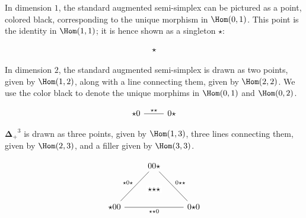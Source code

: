 \documentclass[10pt]{art.cls/art}
\newcommand{\DeltaPlus}{\ensuremath{\boldsymbol{\Delta}_+}}
\newcommand{\kstar}{{\star}}
\begin{document}
\begin{example}[$\DeltaPlus^1$]
  In dimension $1$, the standard augmented semi-simplex can be pictured as a point, colored black, corresponding to the unique morphism in $\Hom(0, 1)$. This point is the identity in $\Hom(1, 1)$; it is hence shown as a singleton $\kstar$:

  \begin{equation*}
    \begin{tikzcd}
      \kstar
    \end{tikzcd}
  \end{equation*}
\end{example}

\begin{example}[$\DeltaPlus^2$]
  In dimension $2$, the standard augmented semi-simplex is drawn as two points, given by $\Hom(1, 2)$, along with a line connecting them, given by $\Hom(2, 2)$. We use the color black to denote the unique morphims in $\Hom(0, 1)$ and $\Hom(0, 2)$.

  \begin{equation*}
    \begin{tikzcd}
      \kstar0 \arrow[r, dash, "\kstar\kstar"] & 0\kstar
    \end{tikzcd}
  \end{equation*}
\end{example}

\begin{example}[$\DeltaPlus^3$]
  $\DeltaPlus^3$ is drawn as three points, given by $\Hom(1, 3)$, three lines connecting them, given by $\Hom(2, 3)$, and a filler given by $\Hom(3, 3)$.

  \begin{equation*}
    \begin{tikzcd}
      & |[alias=F]|00\kstar \arrow[ddr, dash, "0\kstar\kstar"] & \\\\
      \kstar00 \arrow[rr, dash, "\kstar\kstar0"{name=T, below}]\arrow[uur, dash, "\kstar0\kstar"] && 0\kstar0 \\
      \arrow[rightarrow, from=F, to=T, phantom, "\kstar\kstar\kstar" description]
    \end{tikzcd}
  \end{equation*}
\end{example}
\end{document}
